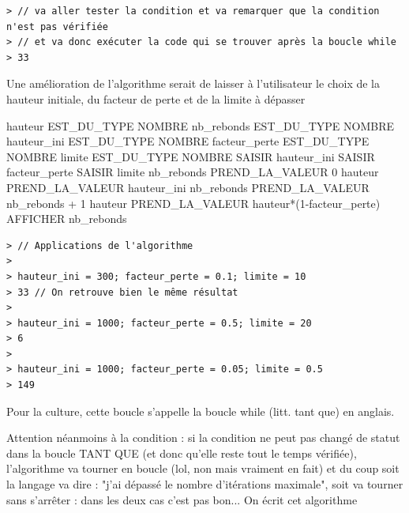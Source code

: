 \begin{exemple}
\begin{verbatim}
> // va aller tester la condition et va remarquer que la condition n'est pas vérifiée 
> // et va donc exécuter la code qui se trouver après la boucle while
> 33 
\end{verbatim}
Une amélioration de l'algorithme serait de laisser à l'utilisateur le choix de la hauteur initiale, du facteur de perte et de la limite à dépasser 
\begin{algobox}
\Variables
\Ligne hauteur EST\_DU\_TYPE NOMBRE
\Ligne nb\_rebonds EST\_DU\_TYPE NOMBRE
\Ligne hauteur\_ini EST\_DU\_TYPE NOMBRE
\Ligne facteur\_perte EST\_DU\_TYPE NOMBRE
\Ligne limite EST\_DU\_TYPE NOMBRE
\DebutAlgo
\Ligne SAISIR hauteur\_ini
\Ligne SAISIR facteur\_perte
\Ligne SAISIR limite
\Ligne nb\_rebonds PREND\_LA\_VALEUR 0
\Ligne hauteur PREND\_LA\_VALEUR hauteur\_ini
\DebutTantQue
\Ligne nb\_rebonds PREND\_LA\_VALEUR nb\_rebonds + 1
\Ligne hauteur PREND\_LA\_VALEUR hauteur*(1-facteur\_perte)
\FinTantQue
\Ligne AFFICHER nb\_rebonds
\FinAlgo
\end{algobox}
\begin{verbatim}
> // Applications de l'algorithme
>
> hauteur_ini = 300; facteur_perte = 0.1; limite = 10
> 33 // On retrouve bien le même résultat
> 
> hauteur_ini = 1000; facteur_perte = 0.5; limite = 20
> 6
>
> hauteur_ini = 1000; facteur_perte = 0.05; limite = 0.5
> 149
\end{verbatim}
\end{exemple}
Pour la culture, cette boucle s'appelle la boucle while (litt. tant que) en anglais. \newline

Attention néanmoins à la condition : si la condition ne peut pas changé de statut dans la boucle TANT QUE (et donc qu'elle reste tout le temps vérifiée), l'algorithme va tourner en boucle (lol, non mais vraiment en fait) et du coup soit la langage va dire : "j'ai dépassé le nombre d'itérations maximale", soit va tourner sans s'arrêter : dans les deux cas c'est pas bon...
On écrit cet algorithme 

